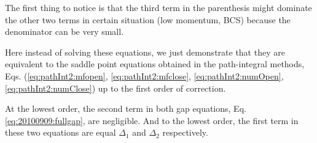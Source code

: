 The first thing to notice is that the third term in the parenthesis might dominate the other two terms in  certain situation (low momentum, BCS) because the denominator can be very small.  

Here instead of solving these equations, we just demonstrate that they are equivalent to the saddle point equations obtained in the path-integral methods, Eqs. (\ref{eq:pathInt2:mfopen}, \ref{eq:pathInt2:mfclose}, \ref{eq:pathInt2:numOpen}, \ref{eq:pathInt2:numClose}) up to the first order of correction.

At the lowest order, the second term in both gap equations, Eq. \ref{eq:20100909:fullgap}, are negligible.  And to the lowest order, the first term in these two equations are equal $\Delta_{1}$ and $\Delta_{2}$ respectively.  











































